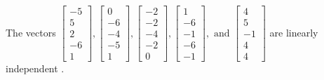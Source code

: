 \begin{exercise}
\begin{exerciseStatement}
  \end{exerciseStatement}
  \begin{exerciseAnswer}
   The vectors \(\left[\begin{array}{r}
-5 \\
5 \\
2 \\
-6 \\
1
\end{array}\right] , \left[\begin{array}{r}
0 \\
-6 \\
-4 \\
-5 \\
1
\end{array}\right] , \left[\begin{array}{r}
-2 \\
-2 \\
-4 \\
-2 \\
0
\end{array}\right] , \left[\begin{array}{r}
1 \\
-6 \\
-1 \\
-6 \\
-1
\end{array}\right] , \text{ and } \left[\begin{array}{r}
4 \\
5 \\
-1 \\
4 \\
4
\end{array}\right]\) are 
  	 linearly independent  .
  


  \end{exerciseAnswer}
\end{exercise}